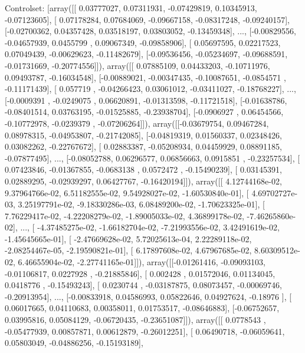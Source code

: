 \documentclass{article}
\begin{document}
Controlset: [array([[ 0.03777027,  0.07311931, -0.07429819,  0.10345913, -0.07123605],
       [ 0.07178284,  0.07684069, -0.09667158, -0.08317248, -0.09240157],
       [-0.02700362,  0.04357428,  0.03518197,  0.03803052, -0.13459348],
       ..., 
       [-0.00829556, -0.04657939,  0.0455799 ,  0.09067349, -0.09858906],
       [ 0.05697595,  0.02217523,  0.07049439, -0.00629623, -0.11482679],
       [-0.09536456, -0.05234697, -0.09688591, -0.01731669, -0.20774556]]), array([[ 0.07885109,  0.04433203, -0.10711976,  0.09493787, -0.16034548],
       [-0.00889021, -0.00347435, -0.10087651, -0.0854571 , -0.11171439],
       [ 0.057719  , -0.04266423,  0.03061012, -0.03411027, -0.18768227],
       ..., 
       [-0.0009391 , -0.0249075 ,  0.06620891, -0.01313598, -0.11721518],
       [-0.01638786, -0.08401514,  0.03763195, -0.01525885, -0.23938704],
       [-0.0906927 ,  0.06454566, -0.10772978, -0.0239379 , -0.07206264]]), array([[-0.03679754,  0.09467284,  0.08978315, -0.04953807, -0.21742085],
       [-0.04819319,  0.01560337,  0.02348426,  0.03082262, -0.22767672],
       [ 0.02883387, -0.05208934,  0.04459929,  0.08891185, -0.07877495],
       ..., 
       [-0.08052788,  0.06296577,  0.06856663,  0.0915851 , -0.23257534],
       [ 0.07423846, -0.01367855, -0.0683138 ,  0.0572472 , -0.15490239],
       [ 0.03145391,  0.02889295, -0.02939297,  0.06427767, -0.16420194]]), array([[  4.12744168e-02,   9.37964766e-02,   6.51182555e-02,
          9.54928027e-02,  -1.60530840e-01],
       [  4.69702727e-03,   3.25197791e-02,  -9.18330286e-03,
          6.08489200e-02,  -1.70623325e-01],
       [  7.76229417e-02,  -4.22208279e-02,  -1.89005033e-02,
          4.36899178e-02,  -7.46265860e-02],
       ..., 
       [ -4.37485275e-02,  -1.66182704e-02,  -7.21993556e-02,
          3.42491619e-02,  -1.45645665e-01],
       [ -2.47669628e-02,   5.72025613e-04,   2.22289118e-02,
         -2.08254467e-05,  -2.19590821e-01],
       [  6.17897608e-02,   4.67967685e-02,   8.60309512e-02,
          6.46655904e-02,  -2.27741165e-01]]), array([[-0.01261416, -0.09093103, -0.01106817,  0.0227928 , -0.21885846],
       [ 0.002428  ,  0.01572046,  0.01134045,  0.0418776 , -0.15493243],
       [ 0.0230744 , -0.03187875,  0.08073457, -0.00069746, -0.20913954],
       ..., 
       [-0.00833918,  0.04586993,  0.05822646,  0.04927624, -0.18976   ],
       [ 0.06017665,  0.04110683,  0.00358011,  0.01753517, -0.08646883],
       [-0.06752657,  0.03995816,  0.05084129, -0.06720435, -0.23651087]]), array([[ 0.0778543 , -0.05477939,  0.00857871,  0.00612879, -0.26012251],
       [ 0.06490718, -0.06059641,  0.05803049, -0.04886256, -0.15193189],
\end{document}
